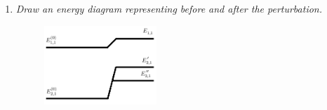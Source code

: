 \begin{example}
\begin{enumerate}
\begin{enumerate}
			\item \emph{Draw an energy diagram representing before and after the perturbation.}\newline
			\begin{figure}[ht]
				\captionsetup{width=1\textwidth}
				\centering
				\includegraphics[width=0.4\textwidth]{figures/perturb}
				\caption{}
			\end{figure}
			
		\end{enumerate}
		
	\end{enumerate}
\end{example}


